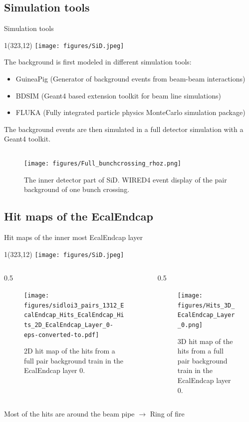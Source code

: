 \documentclass[xcolor={dvipsnames}]{beamer}
\newcommand{\sidlogo}{
  \setlength{\TPHorizModule}{1pt}
  \setlength{\TPVertModule}{1pt}
  \begin{textblock}{1}(323,12)
   \texttt{[image: figures/SiD.jpeg]}
  \end{textblock}
  }
\begin{document}
\subsection{Simulation tools}
\begin{frame}{Simulation tools}
\sidlogo
The background is first modeled in different simulation tools:\\
\begin{itemize}
\item \alert{GuineaPig} (Generator of background events from beam-beam interactions)
\item \alert{BDSIM} (Geant4 based extension toolkit for beam line simulations)
\item \alert{FLUKA} (Fully integrated particle physics MonteCarlo simulation package)
\end{itemize}
\vspace*{0.5cm}
The background events are then simulated in a \alert{full detector simulation} with a Geant4 toolkit.\\
\vspace*{0.2cm}
\begin{figure}
	\begin{columns}
         \flushright
        \texttt{[image: figures/Full\_bunchcrossing\_rhoz.png]}
        \caption{\small The inner detector part of SiD. WIRED4 event display of the pair background of one bunch crossing.}
      \end{columns}
\end{figure}
\end{frame}

\subsection{Hit maps of the EcalEndcap}
\begin{frame}{Hit maps of the inner most EcalEndcap layer}
\sidlogo
\begin{columns}[T]
\begin{column}[b]{0.5\textwidth}
 \begin{figure}
\centering
\texttt{[image: figures/sidloi3\_pairs\_1312\_EcalEndcap\_Hits\_EcalEndcap\_Hits\_2D\_EcalEndcap\_Layer\_0-eps-converted-to.pdf]}
\caption{\small 2D hit map of the hits from a full pair background train in the EcalEndcap layer 0.}
\end{figure}
\end{column}
\begin{column}[b]{0.5\textwidth}
 \begin{figure}
\centering
\texttt{[image: figures/Hits\_3D\_EcalEndcap\_Layer\_0.png]}
\caption{\small 3D hit map of the hits from a full pair background train in the EcalEndcap layer 0.}
\end{figure}
\end{column}
\end{columns}
Most of the hits are around the beam pipe $\rightarrow$ Ring of fire
\end{frame}
\end{document}
